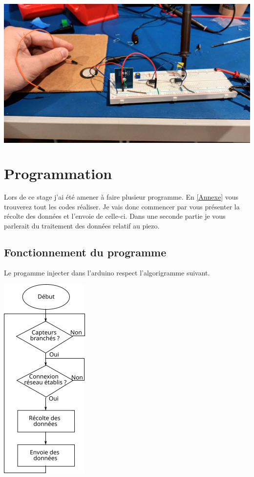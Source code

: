 \documentclass[12pt,french,a4paper]{article}
\begin{document}
\begin{center}	
\includegraphics[scale=0.1]{../img/froty.jpg}
\label{M}
\end{center}

\newpage
\section{Programmation}
Lors de ce stage j'ai été amener à faire plusieur programme. En \ref{Annexe} vous trouverez tout les codes réaliser. Je vais donc commencer par vous présenter la récolte des données et l'envoie de celle-ci. Dans une seconde partie je vous parlerait du traitement des données relatif au piezo. 

\subsection{Fonctionnement du programme}
Le progamme injecter dans l'arduino respect l'algorigramme suivant. 

\begin{center}	
\includegraphics[scale=1]{../img/algorigrame.png}
\label{M}
\end{center}
\end{document}

